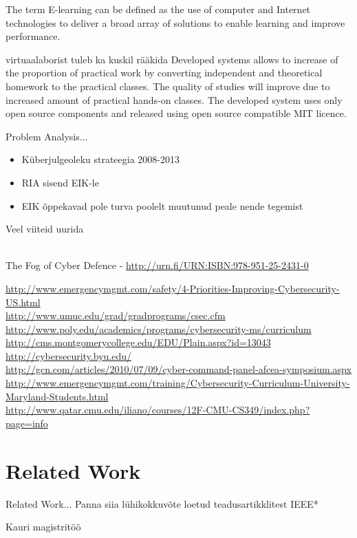 The term E-learning can be defined as the use of computer and Internet technologies to deliver a broad array of solutions to enable learning and improve performance. \citep[p.~3]{food2011learning}

{\color{red} virtuaalaborist tuleb ka kuskil rääkida }
Developed systems allows to  increase of the proportion of practical work by converting independent and theoretical homework to  the practical classes. The quality of studies will improve due to increased amount of practical hands-on classes. The developed system uses only open source components and released using open source compatible MIT licence.

Problem Analysis...
\begin{itemize}
	\item Küberjulgeoleku strateegia 2008-2013
	\item RIA sisend EIK-le
	\item EIK õppekavad pole turva poolelt muutunud peale nende tegemist
\end{itemize}


Veel viiteid uurida 
{\scriptsize
\\

The Fog of Cyber Defence - \url{http://urn.fi/URN:ISBN:978-951-25-2431-0}

\url{http://www.emergencymgmt.com/safety/4-Priorities-Improving-Cybersecurity-US.html}\\
\url{http://www.umuc.edu/grad/gradprograms/csec.cfm}
\\
\url{http://www.poly.edu/academics/programs/cybersecurity-ms/curriculum}\\
\url{http://cms.montgomerycollege.edu/EDU/Plain.aspx?id=13043}\\
\url{http://cybersecurity.byu.edu/}\\
\url{http://gcn.com/articles/2010/07/09/cyber-command-panel-afcea-symposium.aspx}\\
\url{http://www.emergencymgmt.com/training/Cybersecurity-Curriculum-University-Maryland-Students.html}\\
\url{http://www.qatar.cmu.edu/iliano/courses/12F-CMU-CS349/index.php?page=info}\\
}
\section{Related Work}
\label{Related Work}
Related Work...
Panna siia lühikokkuvõte loetud teadusartikklitest IEEE*

Kauri magistritöö




